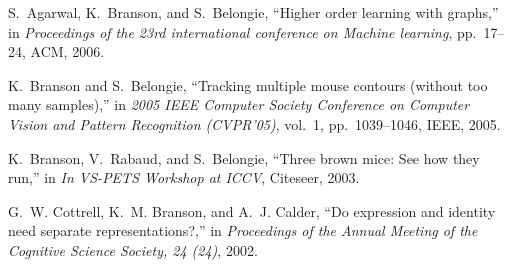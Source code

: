 \begin{cvenum}
\item S.~Agarwal, K.~Branson, and S.~Belongie, ``Higher order learning with graphs,''
  in {\em Proceedings of the 23rd international conference on Machine
  learning}, pp.~17--24, ACM, 2006.

\item K.~Branson and S.~Belongie, ``Tracking multiple mouse contours (without too
  many samples),'' in {\em 2005 IEEE Computer Society Conference on Computer
  Vision and Pattern Recognition (CVPR'05)}, vol.~1, pp.~1039--1046, IEEE,
  2005.

\item K.~Branson, V.~Rabaud, and S.~Belongie, ``Three brown mice: See how they run,''
  in {\em In VS-PETS Workshop at ICCV}, Citeseer, 2003.

\item G.~W. Cottrell, K.~M. Branson, and A.~J. Calder, ``Do expression and identity
  need separate representations?,'' in {\em Proceedings of the Annual Meeting
  of the Cognitive Science Society, 24 (24)}, 2002.

\end{cvenum}
